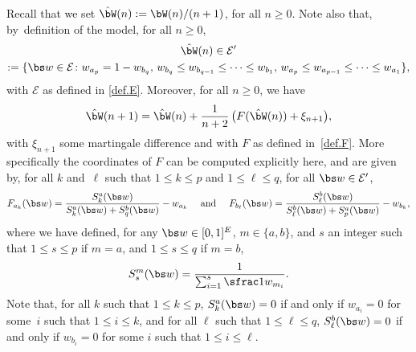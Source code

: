 \label{subsec.2paths.2}
Recall that we set $\hat \bW(n) := \bW(n)/(n+1)$, for all $n\geq 0$.
Note also that, by~definition of the model, for all $n\geq 0$,
\begin{multline*}
\hat {\bW}(n) \in \mathcal E' \\
:=
\{\bs w \in \mathcal E \colon w_{a_p} = 1 - w_{b_q},\, w_{b_q}\leq w_{b_{q-1}}\leq\cdots \leq w_{b_1},\,
w_{a_p}\leq w_{a_{p-1}}\leq\cdots\leq w_{a_1}\},
\end{multline*}
with $\mathcal E$ as defined in \eqref{def.E}.
Moreover, for all $n\geq 0$, we have
\[
\hat \bW(n+1) = \hat\bW(n) +
\frac1{n+2}\,\bigl(F(\hat\bW(n)) + \xi_{n+1}\bigr),
\]
with $\xi_{n+1}$ some martingale difference and with $F$ as defined in~\eqref{def.F}. More specifically the coordinates of $F$ can be computed explicitly here,
and are given by, for all $k$ and~$\ell$ such that $1\leq k\leq p$ and $1\leq \ell\leq q$, for all $\bs w\in \mathcal E'$,
\begin{equation}\label{eq:Fab}
F_{a_k}(\bs w) = \frac{S^a_k(\bs w)}
{S^a_k(\bs w)+S^b_q(\bs w)}
-w_{a_k}
\quad\text{ and }\quad
F_{b_\ell}(\bs w) = \frac{S^b_\ell(\bs w)}
{S^b_\ell(\bs w)+S^a_p(\bs w)}
-w_{b_k},
\end{equation}
where we have defined, for any $\bs w \in [0,1]^E$, $m\in\{a,b\}$,
and $s$ an integer such that $1\leq s\leq p$ if $m = a$, and $1\leq s\leq q$ if $m = b$,
\begin{equation}\label{eq:def_Sq}
S^m_s(\bs w) = \frac1{\sum_{i=1}^s\sfrac1{w_{m_i}}}.
\end{equation}
Note that, for all $k$ such that $1\le k\le p$, $S_k^a(\bs w)=0$ if and only if $w_{a_i}=0$ for some~$i$ such that $1\le i \le k$,
and for all $\ell$ such that $1\le \ell\le q$, $S_\ell^b(\bs w)=0$ if and only if $w_{b_i}=0$ for some $i$ such that $1\le i \le \ell$.

